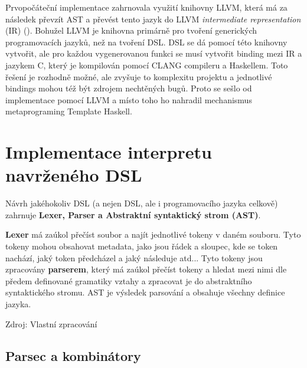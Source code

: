 \documentclass[male,czech]{kithesis}
\begin{document}
Prvopočáteční implementace zahrnovala využití knihovny LLVM,
která má za následek převzít AST a 
převést tento jazyk do LLVM \textit{intermediate representation} (IR) (\cite{IntroToLLVM}).
Bohužel LLVM je knihovna primárně pro tvoření generických programovacích jazyků, 
než na tvoření DSL. 
DSL se dá pomocí této knihovny vytvořit, 
ale pro každou vygenerovanou funkci se musí vytvořit binding mezi IR a
jazykem C, 
který je kompilován pomocí CLANG compileru a Haskellem. 
Toto řešení je rozhodně možné, 
ale zvyšuje to komplexitu projektu a 
jednotlivé bindings mohou též být zdrojem nechtěných bugů. 
Proto se sešlo od implementace pomocí LLVM a
místo toho ho nahradil mechanismus metaprograming Template Haskell.


\chapter{Implementace interpretu navrženého DSL}

Návrh jakéhokoliv DSL (a nejen DSL, ale i programovacího jazyka celkově) zahrnuje
\textbf{Lexer, Parser a Abstraktní syntaktický strom (AST)}.

\textbf{Lexer} má zaúkol přečíst soubor a 
najít jednotlivé tokeny v daném souboru.
Tyto tokeny mohou obsahovat metadata, 
jako jsou řádek a sloupec, 
kde se token nachází,
jaký token předcházel a jaký následuje atd... 
Tyto tokeny jsou zpracovány \textbf{parserem}, 
který má zaúkol přečíst tokeny a 
hledat mezi nimi dle předem definované gramatiky vztahy a 
zpracovat je do abstraktního syntaktického stromu. 
AST je výsledek parsování a 
obsahuje všechny definice jazyka.

{\begin{center}
Zdroj: Vlastní zpracování
\end{center}
}

\section{Parsec a kombinátory}
\end{document}
